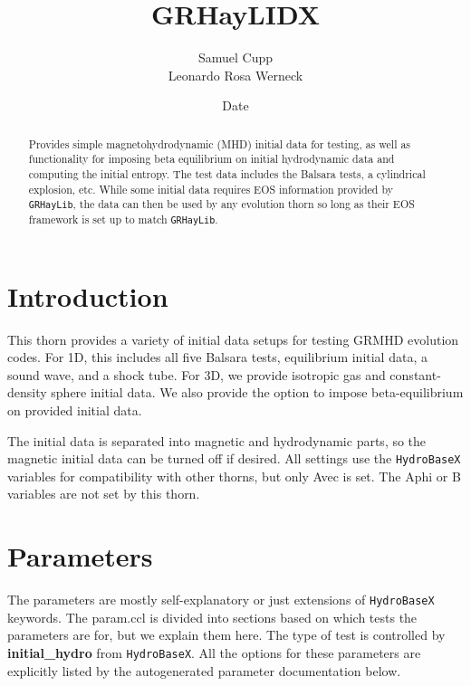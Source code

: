 \documentclass{article}
\begin{document}
\title{GRHayLIDX}
\author{Samuel Cupp \\ Leonardo Rosa Werneck}
\date{$ $Date$ $}

\maketitle


\newcommand{\glib}{\texttt{GRHayLib}}
\newcommand{\gid}{\texttt{GRHayLIDX}}
\newcommand{\hbase}{\texttt{HydroBaseX}}

\begin{abstract}
Provides simple magnetohydrodynamic (MHD) initial data for testing,
as well as functionality for imposing beta equilibrium on initial
hydrodynamic data and computing the initial entropy. The test data
includes the Balsara tests, a cylindrical explosion, etc. While
some initial data requires EOS information provided by \glib,
the data can then be used by any evolution thorn so long as their EOS
framework is set up to match \glib.
\end{abstract}

\section{Introduction}

This thorn provides a variety of initial data setups for
testing GRMHD evolution codes. For 1D, this includes all five
Balsara tests, equilibrium initial data, a sound wave, and
a shock tube. For 3D, we provide isotropic gas and
constant-density sphere initial data. We also provide the option
to impose beta-equilibrium on provided initial data.

The initial data is separated into magnetic and hydrodynamic
parts, so the magnetic initial data can be turned off if desired.
All settings use the \hbase{} variables for compatibility with
other thorns, but only Avec is set. The Aphi or B variables are
not set by this thorn.

\section{Parameters}

The parameters are mostly self-explanatory or just extensions of
\hbase{} keywords. The param.ccl is divided into sections based
on which tests the parameters are for, but we explain them here.
The type of test is controlled by \textbf{initial\_hydro} from
\hbase. All the options for these parameters are explicitly
listed by the autogenerated parameter documentation below.
\end{document}
